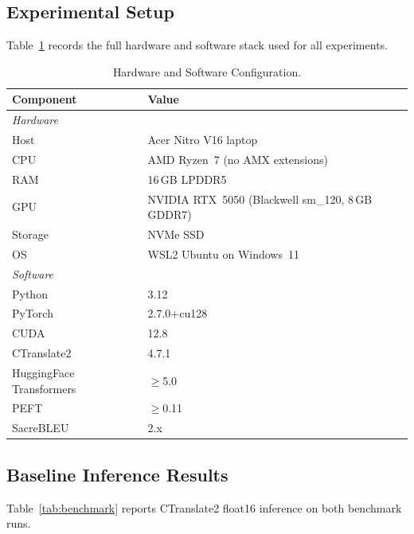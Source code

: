 \documentclass[journal]{IEEEtran}
\begin{document}
\subsection{Experimental Setup}

Table~\ref{tab:hw} records the full hardware and software stack used for
all experiments.

\begin{table}[htbp]
\caption{Hardware and Software Configuration.}
\label{tab:hw}
\centering
\small
\begin{tabular}{ll}
\toprule
Component & Value \\
\midrule
\multicolumn{2}{l}{\textit{Hardware}} \\
Host & Acer Nitro V16 laptop \\
CPU & AMD Ryzen~7 (no AMX extensions) \\
RAM & 16\,GB LPDDR5 \\
GPU & NVIDIA RTX~5050 (Blackwell sm\_120, 8\,GB GDDR7) \\
Storage & NVMe SSD \\
OS & WSL2 Ubuntu on Windows~11 \\
\midrule
\multicolumn{2}{l}{\textit{Software}} \\
Python & 3.12 \\
PyTorch & 2.7.0+cu128~\cite{pytorch2024} \\
CUDA & 12.8 \\
CTranslate2 & 4.7.1~\cite{ctranslate2_klein} \\
HuggingFace Transformers & $\geq$5.0~\cite{wolf2020transformers} \\
PEFT & $\geq$0.11~\cite{peft2022} \\
SacreBLEU & 2.x~\cite{post2018call} \\
\bottomrule
\end{tabular}
\end{table}

\subsection{Baseline Inference Results}

Table~\ref{tab:benchmark} reports CTranslate2 float16 inference on both benchmark runs.
\end{document}
